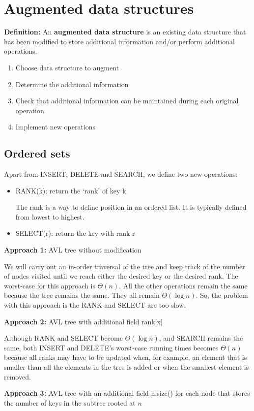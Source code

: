 \documentclass[11pt]{article}
\begin{document}
\newpage 
\section{Augmented data structures}
\textbf{Definition:} An \textbf{augmented data structure} is an existing data structure that has been modified to store additional information and/or perform additional operations.
\begin{enumerate}
    \item Choose data structure to augment
    \item Determine the additional information 
    \item Check that additional information can be maintained during each original operation
    \item Implement new operations
\end{enumerate}

\subsection{Ordered sets}
Apart from INSERT, DELETE and SEARCH, we define two new operations:
\begin{itemize}
    \item RANK(k): return the `rank' of key k
    
    The rank is a way to define position in an ordered list. It is typically defined from lowest to highest. 
    \item SELECT(r): return the key with rank r
\end{itemize}
\textbf{Approach 1:} AVL tree without modification

We will carry out an in-order traversal of the tree and keep track of the number of nodes visited until we reach either the desired key or the desired rank. The worst-case for this approach is $\Theta(n)$. All the other operations remain the same because the tree remains the same. They all remain $\Theta(\log n)$. So, the problem with this approach is the RANK and SELECT are too slow. 

\textbf{Approach 2:} AVL tree with additional field rank[x]

Although RANK and SELECT become $\Theta(\log n)$, and SEARCH remains the same, both INSERT and DELETE's worst-case running times becomes $\Theta(n)$ because all ranks may have to be updated when, for example, an element that is smaller than all the elements in the tree is added or when the smallest element is removed. 

\textbf{Approach 3:} AVL tree with an additional field n.size() for each node that stores the number of keys in the subtree rooted at $n$
\end{document}
